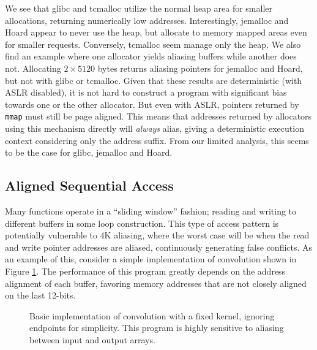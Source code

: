 \documentclass[prodmode,acmtaco]{acmsmall}
\begin{document}
We see that glibc and tcmalloc utilize the normal heap area for smaller allocations, returning numerically low addresses. %
Interestingly, jemalloc and Hoard appear to never use the heap, but allocate to memory mapped areas even for smaller requests.
Conversely, tcmalloc seem manage only the heap.
We also find an example where one allocator yields aliasing buffers while another does not.
Allocating $2 \times 5120$ bytes returns aliasing pointers for jemalloc and Hoard, but not with glibc or tcmalloc.
Given that these results are deterministic (with ASLR disabled), it is not hard to construct a program with significant bias towards one or the other allocator.
But even with ASLR, pointers returned by \texttt{mmap} must still be page aligned.
This means that addresses returned by allocators using this mechanism directly will \emph{always} alias, giving a deterministic execution context considering only the address suffix.
From our limited analysis, this seems to be the case for glibc, jemalloc and Hoard.


\subsection{Aligned Sequential Access}
Many functions operate in a ``sliding window'' fashion; reading and writing to different buffers in some loop construction.
This type of access pattern is potentially vulnerable to 4K aliasing, where the worst case will be when the read and write pointer addresses are aliased, continuously generating false conflicts.
As an example of this, consider a simple implementation of convolution shown in Figure \ref{lst:conv}.
The performance of this program greatly depends on the address alignment of each buffer, favoring memory addresses that are not closely aligned on the last 12-bits.

\begin{figure}[t]
  \centering
  
  \caption{Basic implementation of convolution with a fixed kernel, ignoring endpoints for simplicity. This program is highly sensitive to aliasing between input and output arrays.}
  \label{lst:conv}
\end{figure}
\end{document}
